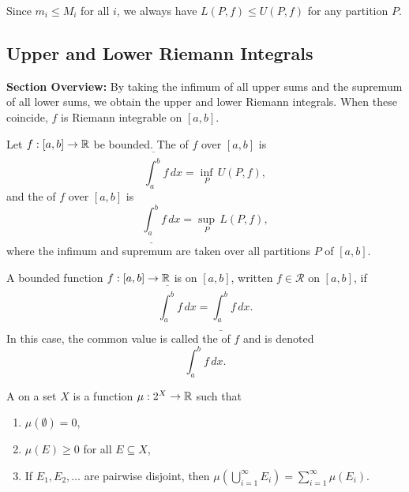 \documentclass[../master/master.tex]{subfiles}
\begin{document}
\begin{remark}
Since $m_i \leq M_i$ for all $i$, we always have $L(P,f) \leq U(P,f)$ for any partition $P$.
\end{remark}

\subsection{Upper and Lower Riemann Integrals}

\begin{summarybox}
\textbf{Section Overview:} By taking the infimum of all upper sums and the supremum of all lower sums, we obtain the upper and lower Riemann integrals. When these coincide, $f$ is Riemann integrable on $[a,b]$.
\end{summarybox}

\begin{definition}
Let $f: [a,b] \to \mathbb{R}$ be bounded. The  of $f$ over $[a,b]$ is
\[
\overline{\int_a^b} f \, dx = \inf_P \, U(P, f),
\]
and the  of $f$ over $[a,b]$ is
\[
\underline{\int_a^b} f \, dx = \sup_P \, L(P, f),
\]
where the infimum and supremum are taken over all partitions $P$ of $[a,b]$.
\end{definition}

\begin{definition}
A bounded function $f: [a,b] \to \mathbb{R}$ is  on $[a,b]$, written $f \in \mathscr{R}$ on $[a,b]$, if
\[
\overline{\int_a^b} f \, dx = \underline{\int_a^b} f \, dx.
\]
In this case, the common value is called the  of $f$ and is denoted
\[
\int_a^b f \, dx.
\]
\end{definition}

\begin{definition}
A  on a set $X$ is a function $\mu: 2^X \to \mathbb{R}$ such that
\begin{enumerate}[label=(\roman*)]
    \item $\mu(\emptyset) = 0$,
    \item $\mu(E) \geq 0$ for all $E \subseteq X$,
    \item If $E_1, E_2, \dots$ are pairwise disjoint, then $\displaystyle\mu\!\left(\bigcup_{i=1}^{\infty} E_i\right) = \sum_{i=1}^{\infty} \mu(E_i)$.
\end{enumerate}
\end{definition}
\end{document}
